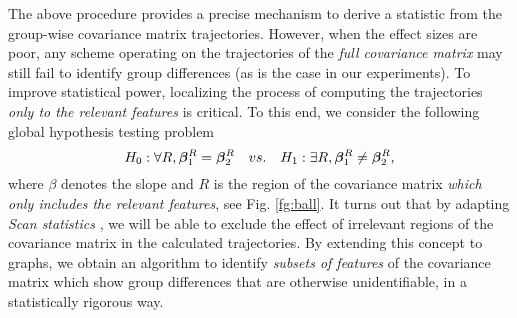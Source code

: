 
The above procedure provides a precise mechanism to derive a statistic from the group-wise covariance matrix trajectories.
However, when the effect sizes are poor, any scheme operating on 
the trajectories of the {\em full covariance matrix} may still fail to identify group differences (as is the case in our experiments). To improve statistical power, localizing the process of computing the trajectories {\em 
  only to the relevant features} is critical. 
%
%
To this end, we consider the following global hypothesis testing problem
\begin{equation*}
H_0: \forall R, \bm{\beta}_1^R=\bm{\beta}_2^R \quad vs. \quad H_1: \exists R, \bm{\beta}_1^R\ne\bm{\beta}_2^R,
\end{equation*}       
where $\beta$ denotes the slope and $R$ is the region of the covariance matrix
{\em which only includes the relevant features}, see Fig. \ref{fg:ball}.
It turns out that by adapting {\em Scan statistics} \cite{fan2012control, arias2011detection}, we will be able to exclude the effect of irrelevant regions of the covariance 
matrix in the calculated trajectories. 
By extending this concept to graphs, we obtain an algorithm to identify {\em subsets of features} of the covariance matrix which show group differences that 
are otherwise unidentifiable, in a statistically rigorous way. 

